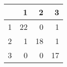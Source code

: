 \begin{tabular}{rrrr}
  \hline
 & 1 & 2 & 3 \\ 
  \hline
1 &  22 &   0 &   1 \\ 
  2 &   1 &  18 &   1 \\ 
  3 &   0 &   0 &  17 \\ 
   \hline
\end{tabular}
